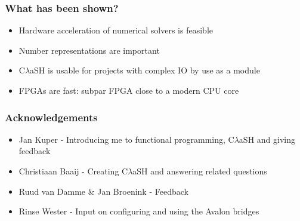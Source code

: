 \documentclass{beamer}[10]
\newcommand{\clash}{C$\lambda$aSH}
\begin{document}
\begin{frame}
	\frametitle{What has been shown?}
	\begin{itemize}
		\item Hardware acceleration of numerical solvers is feasible
		\item Number representations are important
		\item \clash{} is usable for projects with complex IO by use as a module
		\item FPGAs are fast: subpar FPGA close to a modern CPU core
	\end{itemize}
\end{frame}	
	
\begin{frame}
	\frametitle{Acknowledgements}
	\begin{itemize}
		\item Jan Kuper	- Introducing me to functional programming, \clash{} and giving feedback
		\item Christiaan Baaij - Creating \clash{} and answering related questions
		\item Ruud van Damme \& Jan Broenink - Feedback
		\item Rinse Wester - Input on configuring and using the Avalon bridges
	\end{itemize}
\end{frame}
	
\end{document}
